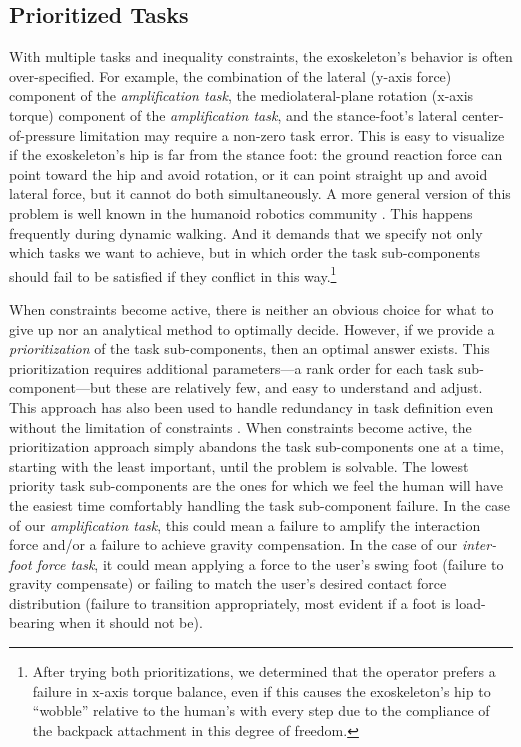 \documentclass[utf8]{frontiersSCNS}
\renewcommand*{\cite}[1]{\citep{#1}}
\begin{document}
\subsection{Prioritized Tasks}\label{sec:lexicographic_cost}
With multiple tasks and inequality constraints, the exoskeleton's behavior is often over-specified.
For example, the combination of the lateral (y-axis force) component of the \emph{amplification task}, the mediolateral-plane rotation (x-axis torque) component of the \emph{amplification task}, and the stance-foot's lateral center-of-pressure limitation may require a non-zero task error. This is easy to visualize if the exoskeleton's hip is far from the stance foot: the ground reaction force can point toward the hip and avoid rotation, or it can point straight up and avoid lateral force, but it cannot do both simultaneously. A more general version of this problem is well known in the humanoid robotics community \cite{BretlLall2008TRO}.
This happens frequently during dynamic walking. And it demands that we specify not only which tasks we want to achieve, but in which order the task sub-components should fail to be satisfied if they conflict in this way.\footnote{After trying both prioritizations, we determined that the operator prefers a failure in x-axis torque balance, even if this causes the exoskeleton's hip to ``wobble'' relative to the human's with every step due to the compliance of the backpack attachment in this degree of freedom.}


When constraints become active, there is neither an obvious choice for what to give up nor an analytical method to optimally decide.
However, if we provide a \emph{prioritization} of the task sub-components, then an optimal answer exists. This prioritization requires additional parameters---a rank order for each task sub-component---but these are relatively few, and easy to understand and adjust.
This approach has also been used to handle redundancy in task definition even without the limitation of constraints \cite{SentisParkKhatib2010TRO}.
When constraints become active, the prioritization approach simply abandons the task sub-components one at a time, starting with the least important, until the problem is solvable.
The lowest priority task sub-components are the ones for which we feel the human will have the easiest time comfortably handling the task sub-component failure.
In the case of our \emph{amplification task}, this could mean a failure to amplify the interaction force and/or a failure to achieve gravity compensation.
In the case of our \emph{inter-foot force task}, it could mean applying a force to the user's swing foot (failure to gravity compensate) or failing to match the user's desired contact force distribution (failure to transition appropriately, most evident if a foot is load-bearing when it should not be).
\end{document}
